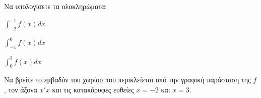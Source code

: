 \begin{alist}
\item Να υπολογίσετε τα ολοκληρώματα:
    \begin{rlist}
    \item $\int_{-2}^{-1} f(x)dx$
    \item $\int_{-1}^{0} f(x)dx$
    \item $\int_{0}^{3} f(x)dx$
    \end{rlist}
\item Να βρείτε το εμβαδόν του χωρίου που περικλείεται από την γραφική παράσταση της $f$, τον άξονα $x'x$ και τις κατακόρυφες ευθείες $x = -2$ και $x = 3$.
\end{alist}
